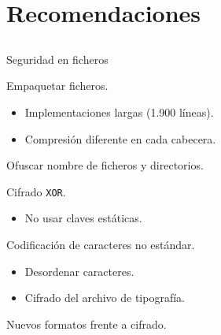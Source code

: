 
\section{Recomendaciones}
\subsection{}

\begin{frame}{Seguridad en ficheros}

\begin{wideitemize}
    \item<1-> Empaquetar ficheros.
    \begin{itemize}
        \item<2-> Implementaciones largas (1.900 líneas).
        \item<3-> Compresión diferente en cada cabecera.
    \end{itemize}

    \item<4-> Ofuscar nombre de ficheros y directorios.

    \item<5-> Cifrado \texttt{XOR}.
    \begin{itemize}
        \item<6-> No usar claves estáticas.
    \end{itemize}

    \item<7-> Codificación de caracteres no estándar.
    \begin{itemize}
        \item<8-> Desordenar caracteres.
        \item<9-> Cifrado del archivo de tipografía.
    \end{itemize}

    \item<10-> Nuevos formatos frente a cifrado.
\end{wideitemize}
\end{frame}

